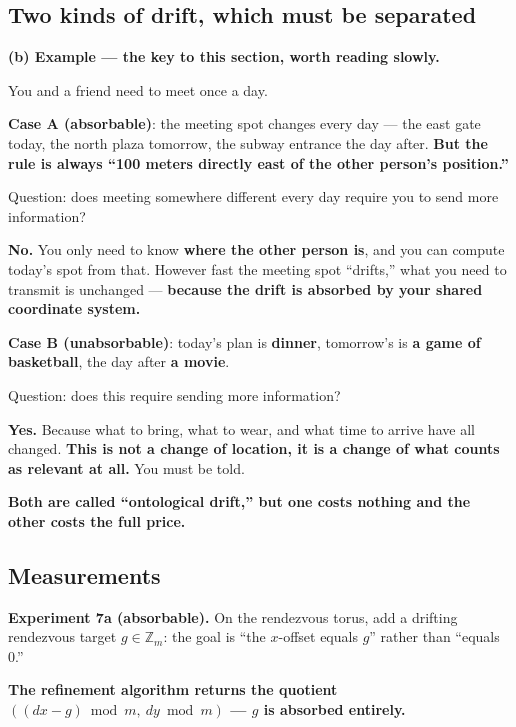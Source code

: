 \documentclass[11pt]{article}
\renewenvironment{quote}
  {\def\FrameCommand{{\color{gray!60}\vrule width 2pt}\hspace{8pt}}%
   \MakeFramed{\advance\hsize-\width \FrameRestore}\begin{itshape}}
  {\end{itshape}\endMakeFramed}
\begin{document}
\hypertarget{two-kinds-of-drift-which-must-be-separated}{%
\subsection{Two kinds of drift, which must be separated}\label{two-kinds-of-drift-which-must-be-separated}}

\textbf{(b) Example --- the key to this section, worth reading slowly.}

You and a friend need to meet once a day.

\textbf{Case A (absorbable)}: the meeting spot changes every day --- the east gate today, the north plaza tomorrow, the subway entrance the day after. \textbf{But the rule is always ``100 meters directly east of the other person's position.''}

Question: does meeting somewhere different every day require you to send more information?

\textbf{No.} You only need to know \textbf{where the other person is}, and you can compute today's spot from that. However fast the meeting spot ``drifts,'' what you need to transmit is unchanged --- \textbf{because the drift is absorbed by your shared coordinate system.}

\textbf{Case B (unabsorbable)}: today's plan is \textbf{dinner}, tomorrow's is \textbf{a game of basketball}, the day after \textbf{a movie}.

Question: does this require sending more information?

\textbf{Yes.} Because what to bring, what to wear, and what time to arrive have all changed. \textbf{This is not a change of location, it is a change of what counts as relevant at all.} You must be told.

\begin{quote}
\textbf{Both are called ``ontological drift,'' but one costs nothing and the other costs the full price.}
\end{quote}

\hypertarget{measurements}{%
\subsection{Measurements}\label{measurements}}

\textbf{Experiment 7a (absorbable).} On the rendezvous torus, add a drifting rendezvous target \(g\in\mathbb Z_m\): the goal is ``the \(x\)-offset equals \(g\)'' rather than ``equals 0.''

\textbf{The refinement algorithm returns the quotient \(((dx-g)\bmod m,\ dy\bmod m)\) --- \(g\) is absorbed entirely.}
\end{document}
